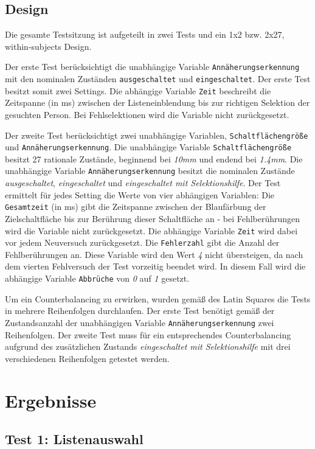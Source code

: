 \documentclass[a4paper,12pt,bibliography=totoc]{scrreprt}%
\begin{document}
\section{Design}
Die gesamte Testsitzung ist aufgeteilt in zwei Tests und ein 1x2 bzw. 2x27, within-subjects Design.

Der erste Test berücksichtigt die unabhängige Variable {\tt Annäherungserkennung} mit den nominalen Zuständen {\tt ausgeschaltet} und {\tt eingeschaltet}. Der erste Test besitzt somit zwei Settings. Die abhängige Variable {\tt Zeit} beschreibt die Zeitspanne (in ms) zwischen der Listeneinblendung bis zur richtigen Selektion der gesuchten Person. Bei Fehlselektionen wird die Variable nicht zurückgesetzt.

Der zweite Test berücksichtigt zwei unabhängige Variablen, {\tt Schaltflächengröße} und {\tt Annäherungserkennung}. Die unabhängige Variable {\tt Schaltflächengröße} besitzt 27 rationale Zustände, beginnend bei \emph{10mm} und endend bei \emph{1.4mm}. Die unabhängige Variable {\tt Annäherungserkennung} besitzt die nominalen Zustände \emph{ausgeschaltet}, \emph{eingeschaltet} und \emph{eingeschaltet mit Selektionshilfe}. Der Test ermittelt für jedes Setting die Werte von vier abhängigen Variablen: Die {\tt Gesamtzeit} (in ms) gibt die Zeitspanne zwischen der Blaufärbung der Zielschaltfläche bis zur Berührung dieser Schaltfläche an - bei Fehlberührungen wird die Variable nicht zurückgesetzt. Die abhängige Variable {\tt Zeit} wird dabei vor jedem Neuversuch zurückgesetzt. Die {\tt Fehlerzahl} gibt die Anzahl der Fehlberührungen an. Diese Variable wird den Wert \emph{4} nicht übersteigen, da nach dem vierten Fehlversuch der Test vorzeitig beendet wird. In diesem Fall wird die abhängige Variable {\tt Abbrüche} von \emph{0} auf \emph{1} gesetzt.

Um ein Counterbalancing zu erwirken, wurden gemäß des Latin Squares die Tests in mehrere Reihenfolgen durchlaufen. Der erste Test benötigt gemäß der Zustandsanzahl der unabhängigen Variable {\tt Annäherungserkennung} zwei Reihenfolgen. Der zweite Test muss für ein entsprechendes Counterbalancing aufgrund des zusätzlichen Zustands \emph{eingeschaltet mit Selektionshilfe} mit drei verschiedenen Reihenfolgen getestet werden.

\chapter{Ergebnisse}


\section{Test 1: Listenauswahl}
\end{document}
